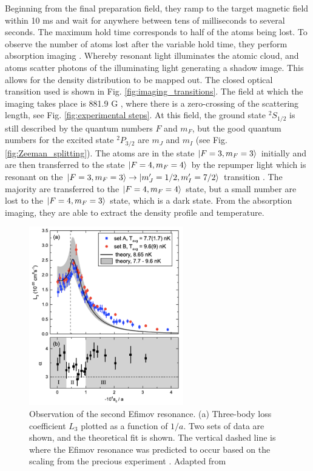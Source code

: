 \documentclass[prl,onecolumn,amsmath,amssymb,titlepage,nofootinbib,preprint]{revtex4-1}
\begin{document}
	 Beginning from the final preparation field, they ramp to the target magnetic field within 10 ms and wait for anywhere between tens of milliseconds to several seconds.  The maximum hold time corresponds to half of the atoms being lost.  To observe the number of atoms lost after the variable hold time, they perform absorption imaging \cite{Huang2014}.  Whereby resonant light illuminates the atomic cloud, and atoms scatter photons of the illuminating light generating a shadow image.  This allows for the density distribution to be mapped out.  The closed optical transition used is shown in Fig. \ref{fig:imaging_transitions}. The field at which the imaging takes place is 881.9 G \cite{Huang2014}, where there is a zero-crossing of the scattering length, see Fig. \ref{fig:experimental steps}.  At this field, the ground state $^{2}S_{1/2}$ is still described by the quantum numbers $F$ and $m_{F}$, but the good quantum numbers for the excited state $^{2}P_{3/2}$ are $m_{J}$ and $m_{I}$ (see Fig. \ref{fig:Zeeman_splitting}).  The atoms are in the state $\ket{F=3,m_{F}=3}$ initially and are then  transferred to the state $\ket{F=4,m_{F}=4}$ by the repumper light  which is resonant on the $\ket{F=3,m_{F}=3}\rightarrow\ket{m'_{J}=1/2,m'_{I}=7/2}$ transition \cite{Berninger2011_thesis}.  The majority are transferred to the $\ket{F=4,m_{F}=4}$ state, but a small number are lost to the $\ket{F=4,m_{F}=3}$ state, which is a dark state.  From the absorption imaging, they are able to extract the density profile and temperature.
	 
	 \begin{figure}
	 	\includegraphics[width=0.6\textwidth]{Figures/second_efimov_evidence}
	 	\caption{Observation of the second Efimov resonance. (a) Three-body loss coefficient $L_{3}$ plotted as a function of $1/a$. Two sets of data are shown, and the theoretical fit is shown. The vertical dashed line is where the Efimov resonance was predicted to occur based on the scaling from the precious experiment \cite{Kraemer2006_1st_observ}. Adapted from \cite{Huang2014}}
	 	\label{fig:second_efimov_evidence}
	 \end{figure}
	 
\end{document}
